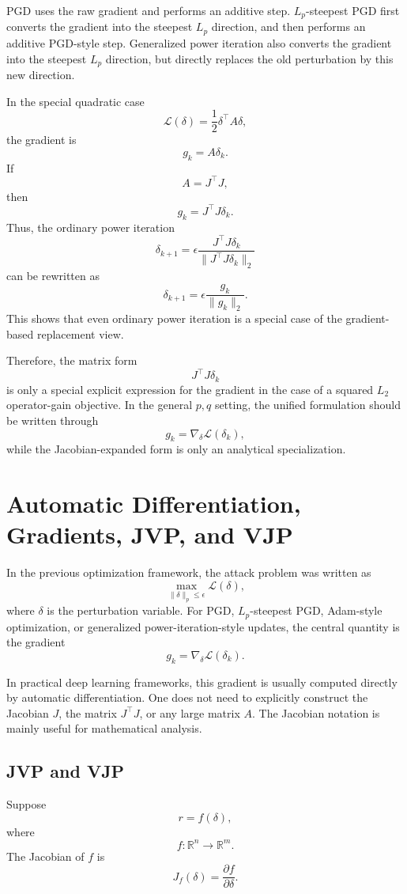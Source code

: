 \documentclass{article}
\begin{document}
PGD uses the raw gradient and performs an additive step.  
$L_p$-steepest PGD first converts the gradient into the steepest $L_p$ direction, and then performs an additive PGD-style step.  
Generalized power iteration also converts the gradient into the steepest $L_p$ direction, but directly replaces the old perturbation by this new direction.

In the special quadratic case
\[
\mathcal L(\delta)
=
\frac12\delta^\top A\delta,
\]
the gradient is
\[
g_k=A\delta_k.
\]
If
\[
A=J^\top J,
\]
then
\[
g_k=J^\top J\delta_k.
\]
Thus, the ordinary power iteration
\[
\delta_{k+1}
=
\epsilon
\frac{J^\top J\delta_k}
{\|J^\top J\delta_k\|_2}
\]
can be rewritten as
\[
\delta_{k+1}
=
\epsilon
\frac{g_k}{\|g_k\|_2}.
\]
This shows that even ordinary power iteration is a special case of the gradient-based replacement view.

Therefore, the matrix form
\[
J^\top J\delta_k
\]
is only a special explicit expression for the gradient in the case of a squared $L_2$ operator-gain objective. In the general $p,q$ setting, the unified formulation should be written through
\[
g_k=\nabla_\delta \mathcal L(\delta_k),
\]
while the Jacobian-expanded form is only an analytical specialization.

\section{Automatic Differentiation, Gradients, JVP, and VJP}

In the previous optimization framework, the attack problem was written as
\[
\max_{\|\delta\|_p\le \epsilon} \mathcal L(\delta),
\]
where $\delta$ is the perturbation variable. For PGD, $L_p$-steepest PGD, Adam-style optimization, or generalized power-iteration-style updates, the central quantity is the gradient
\[
g_k=\nabla_\delta \mathcal L(\delta_k).
\]

In practical deep learning frameworks, this gradient is usually computed directly by automatic differentiation. One does not need to explicitly construct the Jacobian $J$, the matrix $J^\top J$, or any large matrix $A$. The Jacobian notation is mainly useful for mathematical analysis.

\subsection{JVP and VJP}

Suppose
\[
r=f(\delta),
\]
where
\[
f:\mathbb R^n\to \mathbb R^m.
\]
The Jacobian of $f$ is
\[
J_f(\delta)=\frac{\partial f}{\partial \delta}.
\]
\end{document}
